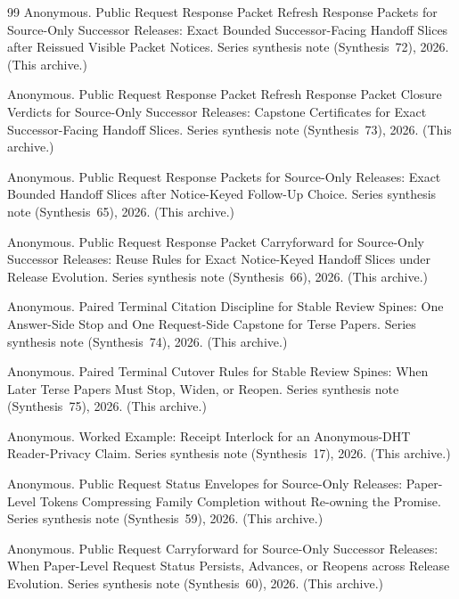 \documentclass[11pt]{article}
\begin{document}
\begin{thebibliography}{99}
Anonymous.
\newblock Public Request Response Packet Refresh Response Packets for Source-Only Successor Releases: Exact Bounded Successor-Facing Handoff Slices after Reissued Visible Packet Notices.
\newblock Series synthesis note (Synthesis~72), 2026. (This archive.)

Anonymous.
\newblock Public Request Response Packet Refresh Response Packet Closure Verdicts for Source-Only Successor Releases: Capstone Certificates for Exact Successor-Facing Handoff Slices.
\newblock Series synthesis note (Synthesis~73), 2026. (This archive.)

Anonymous.
\newblock Public Request Response Packets for Source-Only Releases: Exact Bounded Handoff Slices after Notice-Keyed Follow-Up Choice.
\newblock Series synthesis note (Synthesis~65), 2026. (This archive.)

Anonymous.
\newblock Public Request Response Packet Carryforward for Source-Only Successor Releases: Reuse Rules for Exact Notice-Keyed Handoff Slices under Release Evolution.
\newblock Series synthesis note (Synthesis~66), 2026. (This archive.)

Anonymous.
\newblock Paired Terminal Citation Discipline for Stable Review Spines: One Answer-Side Stop and One Request-Side Capstone for Terse Papers.
\newblock Series synthesis note (Synthesis~74), 2026. (This archive.)

Anonymous.
\newblock Paired Terminal Cutover Rules for Stable Review Spines: When Later Terse Papers Must Stop, Widen, or Reopen.
\newblock Series synthesis note (Synthesis~75), 2026. (This archive.)

Anonymous.
\newblock Worked Example: Receipt Interlock for an Anonymous-DHT Reader-Privacy Claim.
\newblock Series synthesis note (Synthesis~17), 2026. (This archive.)


Anonymous.
\newblock Public Request Status Envelopes for Source-Only Releases: Paper-Level Tokens Compressing Family Completion without Re-owning the Promise.
\newblock Series synthesis note (Synthesis~59), 2026. (This archive.)


Anonymous.
\newblock Public Request Carryforward for Source-Only Successor Releases: When Paper-Level Request Status Persists, Advances, or Reopens across Release Evolution.
\newblock Series synthesis note (Synthesis~60), 2026. (This archive.)


\end{thebibliography}
\end{document}
